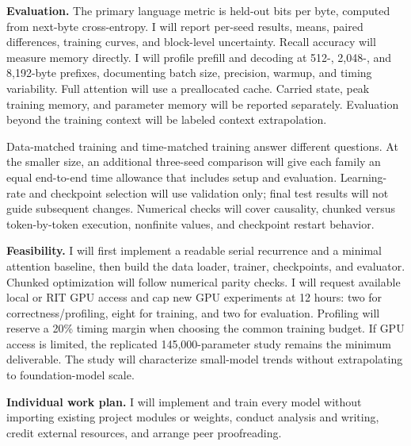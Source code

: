 \documentclass[11pt,letterpaper]{article}
\begin{document}
\textbf{Evaluation.} The primary language metric is held-out bits per byte, computed from next-byte cross-entropy. I will report per-seed results, means, paired differences, training curves, and block-level uncertainty. Recall accuracy will measure memory directly. I will profile prefill and decoding at 512-, 2,048-, and 8,192-byte prefixes, documenting batch size, precision, warmup, and timing variability. Full attention will use a preallocated cache. Carried state, peak training memory, and parameter memory will be reported separately. Evaluation beyond the training context will be labeled context extrapolation.

Data-matched training and time-matched training answer different questions. At the smaller size, an additional three-seed comparison will give each family an equal end-to-end time allowance that includes setup and evaluation. Learning-rate and checkpoint selection will use validation only; final test results will not guide subsequent changes. Numerical checks will cover causality, chunked versus token-by-token execution, nonfinite values, and checkpoint restart behavior.

\textbf{Feasibility.} I will first implement a readable serial recurrence and a minimal attention baseline, then build the data loader, trainer, checkpoints, and evaluator. Chunked optimization will follow numerical parity checks. I will request available local or RIT GPU access and cap new GPU experiments at 12 hours: two for correctness/profiling, eight for training, and two for evaluation. Profiling will reserve a 20\% timing margin when choosing the common training budget. If GPU access is limited, the replicated 145,000-parameter study remains the minimum deliverable. The study will characterize small-model trends without extrapolating to foundation-model scale.

\textbf{Individual work plan.} I will implement and train every model without importing existing project modules or weights, conduct analysis and writing, credit external resources, and arrange peer proofreading.
\end{document}
